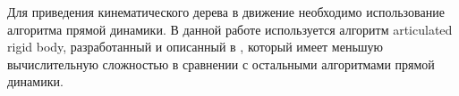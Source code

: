 Для приведения кинематического дерева в движение необходимо использование алгоритма прямой динамики. В данной работе используется алгоритм articulated rigid body, разработанный и описанный в \cite{Featherstone}, который имеет меньшую вычислительную сложностью в сравнении с остальными алгоритмами прямой динамики.









% 











